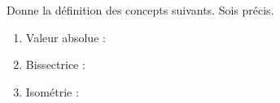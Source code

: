 %
%
    Donne la définition des concepts suivants. Sois précis.
    \begin{enumerate}
        \item Valeur absolue :
        \item Bissectrice :
        \item Isométrie :
    \end{enumerate}
